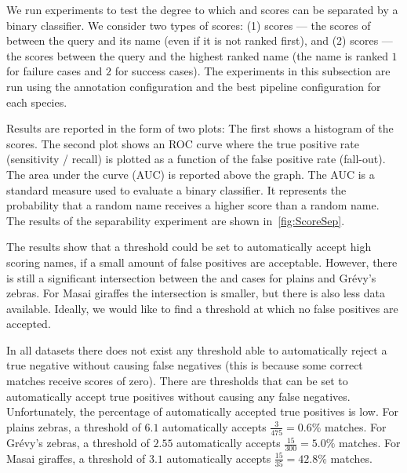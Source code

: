         We run experiments to test the degree to which \groundtrue{} and \groundfalse{} scores can be separated
          by a binary classifier.
        We consider two types of scores:
        (1) \groundtrue{} scores --- the scores of between the query and its \groundtrue{} name (even if it is
          not ranked first), and
        (2) \groundfalse{} scores --- the scores between the query and the highest ranked \groundfalse{} name
          (the \groundfalse{} name is ranked $1$\st{} for failure cases and $2$\nd{} for success cases).
        The experiments in this subsection are run using the \timectrl{} annotation configuration and the best
          pipeline configuration for each species.
           
        Results are reported in the form of two plots:
        The first shows a histogram of the scores.
        The second plot shows an ROC curve where the true positive rate (sensitivity / recall) is plotted as a
          function of the false positive rate (fall-out).
        The area under the curve (AUC) is reported above the graph.
        The AUC is a standard measure used to evaluate a binary classifier.
        It represents the probability that a random \groundtrue{} name receives a higher score than a random
          \groundfalse{} name.
        The results of the separability experiment are shown in~\cref{fig:ScoreSep}.


        \ScoreSep{}

        The results show that a threshold could be set to automatically accept high scoring names, if a small
          amount of false positives are acceptable.
        However, there is still a significant intersection between the \groundtrue{} and \groundfalse{} cases for
          plains and Grévy's zebras.
        For Masai giraffes the intersection is smaller, but there is also less data available.
        Ideally, we would like to find a threshold at which no false positives are accepted.

        In all datasets there does not exist any threshold able to automatically reject a true negative without
          causing false negatives (this is because some correct matches receive scores of zero).
        There are thresholds that can be set to automatically accept true positives without causing any false
          negatives.
        Unfortunately, the percentage of automatically accepted true positives is low.
        For plains zebras, a threshold of $6.1$ automatically accepts $\frac{3}{475} = 0.6\percent$ \groundtrue{}
          matches.
        For Grévy's zebras, a threshold of $2.55$ automatically accepts $\frac{15}{300} = 5.0\percent$
          \groundtrue{} matches.
        For Masai giraffes, a threshold of $3.1$ automatically accepts $\frac{15}{35} = 42.8\percent$
          \groundtrue{} matches.

